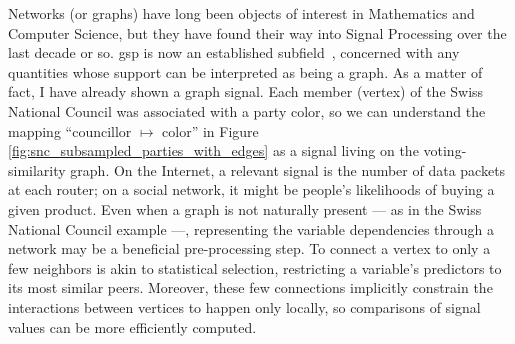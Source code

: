 Networks (or graphs) have long been objects of interest in Mathematics and Computer Science, but they have found their way into Signal Processing over the last decade or so. \acrfull{gsp} is now an established subfield~\cite{shuman2013, sandryhaila2013a, ortega2018}, concerned with any quantities whose support can be interpreted as being a graph. As a matter of fact, I have already shown a graph signal. Each member (vertex) of the Swiss National Council  was associated with a party color, so we can understand the mapping ``councillor $\mapsto$ color'' in Figure \ref{fig:snc_subsampled_parties_with_edges} as a signal living on the voting-similarity graph. On the Internet, a relevant signal is the number of data packets at each router; on a social network, it might be people's likelihoods of buying a given product. Even when a graph is not naturally present --- as in the Swiss National Council example ---, representing the variable dependencies through a network may be a beneficial pre-processing step. To connect a vertex to only a few neighbors is akin to statistical selection, restricting a variable's predictors to its most similar peers. Moreover, these few connections implicitly constrain the interactions between vertices to happen only locally, so comparisons of signal values can be more efficiently computed.

